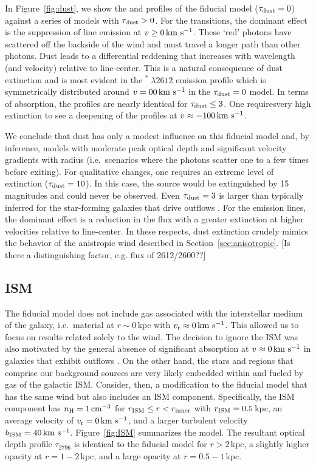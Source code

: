 \documentclass[12pt,preprint]{aastex}
\begin{document}
In Figure~\ref{fig:dust}, we show the  and 
profiles of the fiducial model ($\tau_{\rm dust} = 0$) against a series of
models with $\tau_{\rm dust} > 0$.  For the  transitions, the
dominant effect is the suppression of line emission at $v \ge 0
\, {\rm km~s^{-1}}$.  These `red' photons have scattered off the
backside of the wind and must travel a longer path than other
photons.  Dust leads to a differential reddening that increases with wavelength (and
velocity) relative to line-center. This is a natural consequence of dust
extinction and is most evident in the $^* \; \lambda 2612$
emission profile which is symmetrically distributed around
$v=0 0 \, {\rm km~s^{-1}}$ in the $\tau_{\rm dust}=0$ model.   In terms of absorption, the profiles are
nearly identical for $\tau_{\rm dust} \le 3$.  One requiresvery high
extinction to see a deepening of the profiles at $v \approx -100 \, {\rm km~s^{-1}}$.

We conclude that dust has only a modest influence on this fiducial model and,
by inference, models with moderate peak optical depth and
significant velocity gradients with radius (i.e.\ scenarios where the
photons scatter one to a few times before exiting).
For qualitative changes, one requires an extreme level of
extinction ($\tau_{\rm dust} = 10$).  In this case, the source would be
extinguished by 15\,magnitudes and could never be observed. 
Even $\tau_{\rm dust} = 3$ is larger than typically inferred for the
star-forming galaxies that drive outflows \citep[e.g.][]{dust}.
For the emission lines,
the dominant effect is a reduction in the flux 
with a greater extinction at higher velocities relative to line-center.
In these respects, dust extinction crudely mimics the behavior of the anistropic
wind described in Section~\ref{sec:anisotropic}. [Is there a
distinguishing factor, e.g. flux of 2612/2600??]


\subsection{ISM}
\label{sec:ISM}

The fiducial model does not include gas associated with
the interstellar medium of the galaxy, i.e.\ material at $r \sim
0$\,kpc with $v_{\rm r} \approx 0 \, {\rm km~s^{-1}}$.  This allowed us to focus on
results related solely to the wind.  The decision to ignore the ISM
was also motivated by the general absence of significant absorption at
$v \approx 0 \, {\rm km~s^{-1}}$ in galaxies that exhibit outflows 
\citep[e.g.][]{wcp+09,rubin09,steidel+10}.
On the other hand, the stars and  regions that comprise our
background sources are very likely embedded within and fueled by gas
of the galactic ISM.  
Consider, then, a modification to the fiducial model that has the
same wind but also includes an ISM component. 
Specifically, the ISM component has $n_{\rm H} = 1 \, {\rm cm^{-3}}$ for
$r_{\rm ISM} \le r < r_{\rm inner}$ with $r_{\rm ISM} = 0.5$\,kpc, 
an average velocity of $v_{\rm r} = 0 \, {\rm km~s^{-1}}$, and a larger turbulent velocity $b_{\rm ISM} = 40 \, {\rm km~s^{-1}}$.
Figure~\ref{fig:ISM} summarizes the model.
The resultant optical depth profile $\tau_{2796}$ is identical to the
fiducial model for $r > 2$\,kpc, a slightly higher opacity at
$r=1-2$\,kpc, and a large opacity at $r = 0.5-1$\,kpc.
\end{document}
